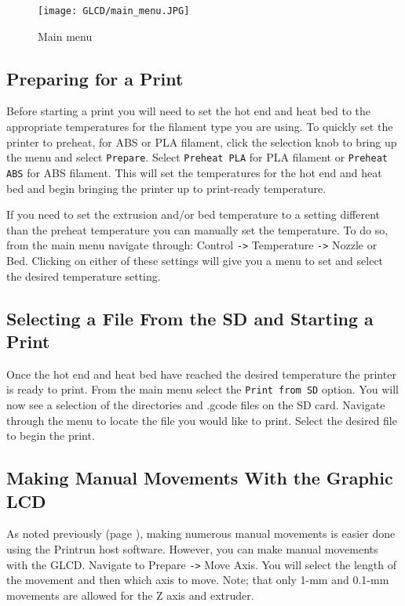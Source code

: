 \begin{figure}[h]
\centering
\texttt{[image: GLCD/main\_menu.JPG]}
\caption{Main menu}
\label{fig:main_menu}
\end{figure}

\subsection{Preparing for a Print}
Before starting a print you will need to set the hot end and heat bed to the appropriate temperatures for the filament type you are using. To quickly set the printer to preheat, for ABS or PLA filament, click the selection knob to bring up the menu and select \texttt{Prepare}. Select \texttt{Preheat PLA} for PLA filament or \texttt{Preheat ABS} for ABS filament. This will set the temperatures for the hot end and heat bed and begin bringing the printer up to print-ready temperature.

If you need to set the extrusion and/or bed temperature to a setting different than the preheat temperature you can manually set the temperature. To do so, from the main menu navigate through: Control \texttt{->} Temperature \texttt{->} Nozzle or Bed. Clicking on either of these settings will give you a menu to set and select the desired temperature setting.

\subsection{Selecting a File From the SD and Starting a Print}
Once the hot end and heat bed have reached the desired temperature the printer is ready to print. From the main menu select the \texttt{Print from SD} option. You will now see a selection of the directories and .gcode files on the SD card. Navigate through the menu to locate the file you would like to print. Select the desired file to begin the print.

\subsection{Making Manual Movements With the Graphic LCD}
As noted previously (page \pageref{sec:Graphic LCD or Printrun Host?}), making numerous manual movements is easier done using the Printrun host software. However, you can make manual movements with the GLCD. Navigate to Prepare \texttt{->} Move Axis. You will select the length of the movement and then which axis to move. Note; that only 1-mm and 0.1-mm movements are allowed for the Z axis and extruder.

